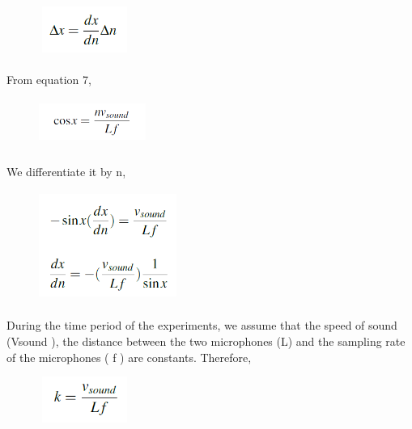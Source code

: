 \documentclass[12pt]{article}
\numberwithin{figure}{section}
\numberwithin{table}{section}
\begin{document}
\begin{figure}[H]
\centering
\includegraphics[width=30mm,height=15mm]{error1.png}
\end{figure}

\paragraph{}
From equation 7,

\begin{figure}[H]
\centering
\includegraphics[width=35mm,height=15mm]{error2.png}
\end{figure}

\paragraph{}
We differentiate it by n,

\begin{figure}[H]
\centering
\includegraphics[width=45mm,height=35mm]{error3.png}
\end{figure}

\paragraph{}
During the time period of the experiments, we assume that the speed of sound (Vsound ), the distance between the two
microphones (L) and the sampling rate of the microphones ( f ) are constants. Therefore,

\begin{figure}[H]
\centering
\includegraphics[width=30mm,height=15mm]{error4.png}
\end{figure}
\end{document}
